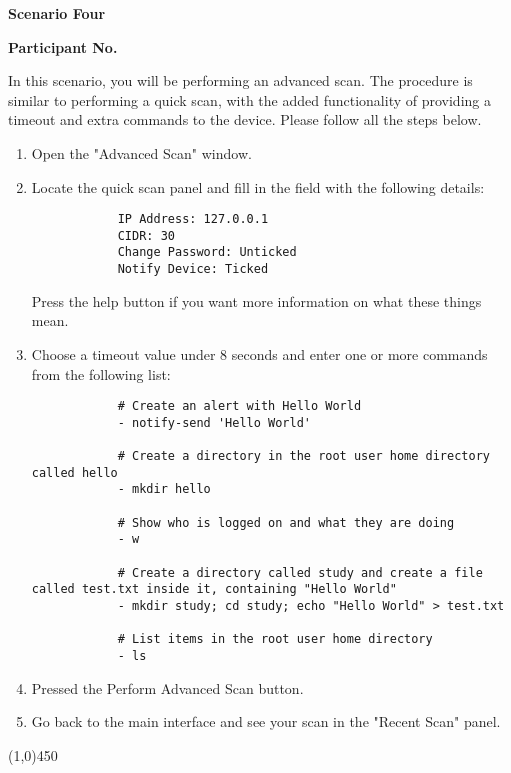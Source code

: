 \begin{center}
	\textbf{Scenario Four}\par
	\textbf{Participant No.}\par
\end{center}

In this scenario, you will be performing an advanced scan. The procedure is similar to performing a quick scan, with the added functionality of providing a timeout and extra commands to the device. Please follow all the steps below.

\vspace{0.5cm}

\begin{enumerate}
	\item{Open the "Advanced Scan" window.}
	\item{
		Locate the quick scan panel and fill in the field with the following details:\par
		\begin{lstlisting}
			IP Address: 127.0.0.1
			CIDR: 30
			Change Password: Unticked
			Notify Device: Ticked
		\end{lstlisting}
		\par Press the help button if you want more information on what these things mean.
	}
	\item{
		Choose a timeout value under 8 seconds and enter one or more commands from the following list:
		\begin{lstlisting}
			# Create an alert with Hello World
			- notify-send 'Hello World'

			# Create a directory in the root user home directory called hello
			- mkdir hello

			# Show who is logged on and what they are doing
			- w

			# Create a directory called study and create a file called test.txt inside it, containing "Hello World"
			- mkdir study; cd study; echo "Hello World" > test.txt

			# List items in the root user home directory
			- ls
		\end{lstlisting}
	}
	\item{Pressed the Perform Advanced Scan button.}
	\item{Go back to the main interface and see your scan in the "Recent Scan" panel.}
\end{enumerate}

\begin{center}
	\line(1,0){450}
\end{center}

